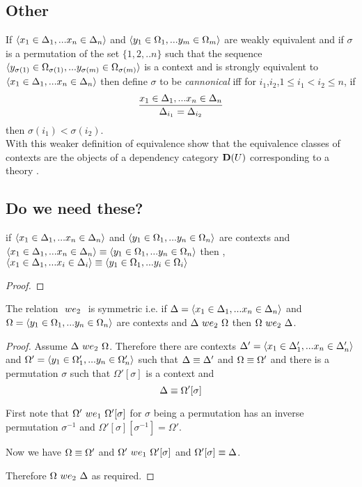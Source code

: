 \documentclass[10pt,a4paper]{scrartcl}
\begin{document}
\subsection{Other}
\noindent 
If $\langle x_1 \in \Delta_1,... x_{n} \in \Delta_{n}\rangle$ 
and $\langle y_1 \in \Omega_1,... y_{m} \in \Omega_{m}\rangle$ are weakly equivalent 
and if $\sigma$ is a permutation of the set $\{1,2,..n\}$
such that the sequence 
$\langle y_{\sigma(1)} \in \Omega_{\sigma(1)},... y_{\sigma(m)} \in \Omega_{\sigma(m)}\rangle$
is a context and 
is strongly equivalent to $\langle x_1 \in \Delta_1,... x_{n} \in \Delta_{n}\rangle$
then define $\sigma$ to be \textit{cannonical} iff
for $i_1$,$i_2$,$1 \leq i_1  < i_2 \leq n$, if 
$$
\frac{x_1 \in \Delta_1,... x_{n} \in \Delta_{n}}{\Delta_{i_1}=\Delta_{i_2}}
$$
then $\sigma(i_1) < \sigma(i_2)$.\\

With this weaker definition of equivalence   show that the 
equivalence classes of contexts are the objects of a dependency category
$\mathbf{D}(U)$ corresponding to a theory \gat. \\

\subsection{Do we need these?}
\begin{lemma}
if $\langle x_1 \in \Delta_1,... x_{n} \in \Delta_{n}\rangle$ 
and $\langle y_1 \in \Omega_1,... y_{n} \in \Omega_{n}\rangle$ are contexts 
and $\langle x_1 \in \Delta_1,... x_{n} \in \Delta_{n}\rangle \equiv \langle y_1 \in \Omega_1,... y_{n} \in \Omega_{n}\rangle$ 
then \foreachi,  $\langle x_1 \in \Delta_1,... x_{i} \in \Delta_{i}\rangle \equiv \langle y_1 \in \Omega_1,... y_{i} \in \Omega_{i}\rangle$
\end{lemma}
\begin{proof}
\end{proof}

\begin{lemma}
The relation $\ we_2\ $ is 
symmetric i.e. if $\Delta=\langle x_1 \in \Delta_1,... x_{n} \in \Delta_{n}\rangle$ 
and $\Omega = \langle y_1 \in \Omega_1,... y_{n} \in \Omega_{n}\rangle$ are contexts 
and $\Delta\ we_2\ \Omega$ 
then $\Omega\ we_2\ \Delta$.
\end{lemma}
\begin{proof}
Assume $\Delta\ we_2\ \Omega$. Therefore there are contexts $\Delta'=\langle x_1 \in \Delta'_1,... x_{n} \in \Delta'_{n}\rangle$ and $\Omega' = \langle y_1 \in \Omega'_1,... y_{n} \in \Omega'_{n}\rangle$  such that $\Delta \equiv \Delta'$ and $\Omega \equiv \Omega'$ and there is a permutation $\sigma$ such that $\Omega'[\sigma]$  is a context and 
\begin{equation}
\Delta \equiv \Omega'[\sigma]
\end{equation}

First note that $\Omega'\ we_1\ \Omega'[\sigma]$ for $\sigma$ being a  permutation has an inverse permutation $\sigma^{-1}$ and  $\Omega'[\sigma][\sigma^{-1}]=\Omega'$.

Now we have $\Omega \equiv \Omega'$ and $\Omega'\ we_1\ \Omega'[\sigma]$ and $ \Omega'[\sigma] \equiv  \Delta$.

Therefore $\Omega\ we_2\ \Delta$ as required.
\end{proof}
\end{document}

